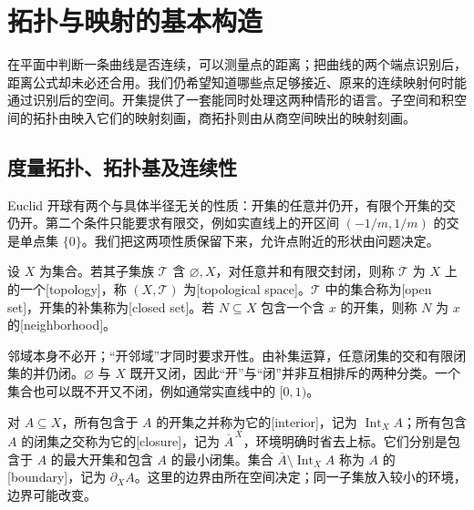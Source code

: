 
% 
% 

\section{拓扑与映射的基本构造}
\label{g1:sec:0401}

在平面中判断一条曲线是否连续，可以测量点的距离；把曲线的两个端点识别后，距离公式却未必还合用。我们仍希望知道哪些点足够接近、原来的连续映射何时能通过识别后的空间。开集提供了一套能同时处理这两种情形的语言。子空间和积空间的拓扑由映入它们的映射刻画，商拓扑则由从商空间映出的映射刻画。

\subsection{度量拓扑、拓扑基及连续性}
\label{g1:subsec:0401:01}

Euclid 开球有两个与具体半径无关的性质：开集的任意并仍开，有限个开集的交仍开。第二个条件只能要求有限交，例如实直线上的开区间 \((-1/m,1/m)\) 的交是单点集 \(\{0\}\)。我们把这两项性质保留下来，允许点附近的形状由问题决定。

\begin{definition}[拓扑空间]\label{g1:def:topology}
	设 \(X\) 为集合。若其子集族 \(\mathcal T\) 含 \(\varnothing,X\)，对任意并和有限交封闭，则称 \(\mathcal T\) 为 \(X\) 上的一个[topology]，称 \((X,\mathcal T)\) 为[topological space]。\(\mathcal T\) 中的集合称为[open set]，开集的补集称为[closed set]。若 \(N\subseteq X\) 包含一个含 \(x\) 的开集，则称 \(N\) 为 \(x\) 的[neighborhood]。
\end{definition}

邻域本身不必开；“开邻域”才同时要求开性。由补集运算，任意闭集的交和有限闭集的并仍闭。\(\varnothing\) 与 \(X\) 既开又闭，因此“开”与“闭”并非互相排斥的两种分类。一个集合也可以既不开又不闭，例如通常实直线中的 \([0,1)\)。

对 \(A\subseteq X\)，所有包含于 \(A\) 的开集之并称为它的[interior]，记为 \(\operatorname{Int}_X A\)；所有包含 \(A\) 的闭集之交称为它的[closure]，记为 \(\overline A^{\,X}\)，环境明确时省去上标。它们分别是包含于 \(A\) 的最大开集和包含 \(A\) 的最小闭集。集合 \(\overline A\setminus\operatorname{Int}_X A\) 称为 \(A\) 的[boundary]，记为 \(\partial_X A\)。这里的边界由所在空间决定；同一子集放入较小的环境，边界可能改变。

